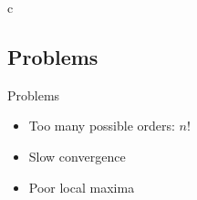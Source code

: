 c\subsection{Problems}
	\begin{frame}
		\begin{block}{Problems}
			\begin{itemize}
				\item Too many possible orders: $n!$
				\item Slow convergence
				\item Poor local maxima
			\end{itemize}
		\end{block}
	\end{frame}